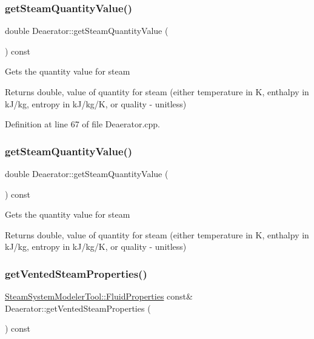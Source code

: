 \subsubsection{\texorpdfstring{get\+Steam\+Quantity\+Value()}{getSteamQuantityValue()}\hspace{0.1cm}{\footnotesize\ttfamily [2/3]}}
{\footnotesize\ttfamily double Deaerator\+::get\+Steam\+Quantity\+Value (\begin{DoxyParamCaption}{ }\end{DoxyParamCaption}) const}

Gets the quantity value for steam \begin{DoxyReturn}{Returns}
double, value of quantity for steam (either temperature in K, enthalpy in k\+J/kg, entropy in k\+J/kg/K, or quality -\/ unitless) 
\end{DoxyReturn}


Definition at line 67 of file Deaerator.\+cpp.

\mbox{\label{class_deaerator_a5473feedca64e7c44143d422ed3e2401}} 
\subsubsection{\texorpdfstring{get\+Steam\+Quantity\+Value()}{getSteamQuantityValue()}\hspace{0.1cm}{\footnotesize\ttfamily [3/3]}}
{\footnotesize\ttfamily double Deaerator\+::get\+Steam\+Quantity\+Value (\begin{DoxyParamCaption}{ }\end{DoxyParamCaption}) const}

Gets the quantity value for steam \begin{DoxyReturn}{Returns}
double, value of quantity for steam (either temperature in K, enthalpy in k\+J/kg, entropy in k\+J/kg/K, or quality -\/ unitless) 
\end{DoxyReturn}
\mbox{\label{class_deaerator_a576a4632452268f77839334d87d5abff}} 
\subsubsection{\texorpdfstring{get\+Vented\+Steam\+Properties()}{getVentedSteamProperties()}\hspace{0.1cm}{\footnotesize\ttfamily [1/3]}}
{\footnotesize\ttfamily \hyperlink{struct_steam_system_modeler_tool_1_1_fluid_properties}{Steam\+System\+Modeler\+Tool\+::\+Fluid\+Properties} const\& Deaerator\+::get\+Vented\+Steam\+Properties (\begin{DoxyParamCaption}{ }\end{DoxyParamCaption}) const\hspace{0.3cm}{\ttfamily [inline]}}

